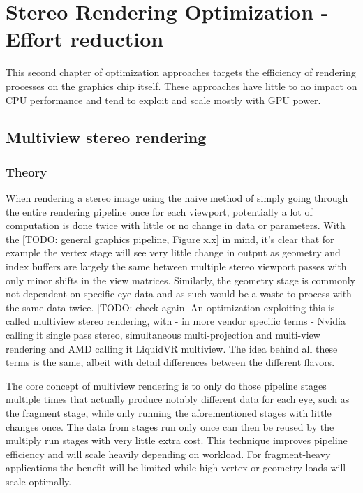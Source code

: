 
\chapter{Stereo Rendering Optimization - Effort reduction}
This second chapter of optimization approaches targets the efficiency of rendering processes on the graphics chip itself. These approaches have little to no impact on CPU performance and tend to exploit and scale mostly with GPU power. 

\section{Multiview stereo rendering}
\subsection{Theory}
When rendering a stereo image using the naive method of simply going through the entire rendering pipeline once for each viewport, potentially a lot of computation is done twice with little or no change in data or parameters. 
With the [TODO: general graphics pipeline, Figure x.x] in mind, it's clear that for example the vertex stage will see very little change in output as geometry and index buffers are largely the same between multiple stereo viewport passes with only minor shifts in the view matrices. Similarly, the geometry stage is commonly not dependent on specific eye data and as such would be a waste to process with the same data twice. [TODO: check again]
An optimization exploiting this is called multiview stereo rendering, with - in more vendor specific terms - Nvidia calling it single pass stereo, simultaneous multi-projection and multi-view rendering and AMD calling it LiquidVR multiview. The idea behind all these terms is the same, albeit with detail differences between the different flavors. 

The core concept of multiview rendering is to only do those pipeline stages multiple times that actually produce notably different data for each eye, such as the fragment stage, while only running the aforementioned stages with little changes once. The data from stages run only once can then be reused by the multiply run stages with very little extra cost. This technique improves pipeline efficiency and will scale heavily depending on workload. For fragment-heavy applications the benefit will be limited while high vertex or geometry loads will scale optimally. 

